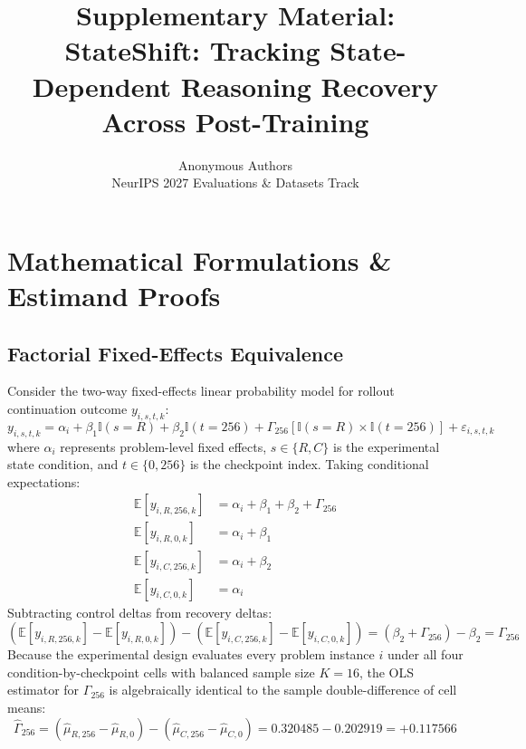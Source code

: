 \documentclass{article}
\title{Supplementary Material: StateShift: Tracking State-Dependent Reasoning Recovery Across Post-Training}
\author{Anonymous Authors \\ NeurIPS 2027 Evaluations \& Datasets Track}
\begin{document}
\maketitle

\appendix

\section{Mathematical Formulations \& Estimand Proofs}

\subsection{Factorial Fixed-Effects Equivalence}
Consider the two-way fixed-effects linear probability model for rollout continuation outcome $y_{i,s,t,k}$:
\begin{equation}
y_{i,s,t,k} = \alpha_i + \beta_1 \mathbb{I}(s = R) + \beta_2 \mathbb{I}(t = 256) + \Gamma_{256} [\mathbb{I}(s = R) \times \mathbb{I}(t = 256)] + \varepsilon_{i,s,t,k}
\end{equation}
where $\alpha_i$ represents problem-level fixed effects, $s \in \{R, C\}$ is the experimental state condition, and $t \in \{0, 256\}$ is the checkpoint index.
Taking conditional expectations:
\begin{align}
\mathbb{E}[y_{i,R,256,k}] &= \alpha_i + \beta_1 + \beta_2 + \Gamma_{256} \\
\mathbb{E}[y_{i,R,0,k}]   &= \alpha_i + \beta_1 \\
\mathbb{E}[y_{i,C,256,k}] &= \alpha_i + \beta_2 \\
\mathbb{E}[y_{i,C,0,k}]   &= \alpha_i
\end{align}
Subtracting control deltas from recovery deltas:
\begin{equation}
(\mathbb{E}[y_{i,R,256,k}] - \mathbb{E}[y_{i,R,0,k}]) - (\mathbb{E}[y_{i,C,256,k}] - \mathbb{E}[y_{i,C,0,k}]) = (\beta_2 + \Gamma_{256}) - \beta_2 = \Gamma_{256}
\end{equation}
Because the experimental design evaluates every problem instance $i$ under all four condition-by-checkpoint cells with balanced sample size $K=16$, the OLS estimator for $\Gamma_{256}$ is algebraically identical to the sample double-difference of cell means:
\begin{equation}
\hat{\Gamma}_{256} = (\hat{\mu}_{R,256} - \hat{\mu}_{R,0}) - (\hat{\mu}_{C,256} - \hat{\mu}_{C,0}) = 0.320485 - 0.202919 = \mathbf{+0.117566}
\end{equation}
\end{document}
